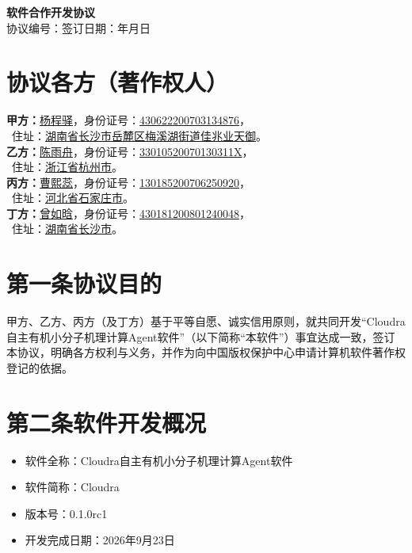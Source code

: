\documentclass[zihao=-4,a4paper,fontset=none]{ctexart}
\begin{document}
\begin{center}
  {\LARGE\bfseries 软件合作开发协议}\\[8pt]
  {\normalsize 协议编号：\underline{\hspace{8em}}\qquad 签订日期：\underline{\hspace{6em}}年\underline{\hspace{3em}}月\underline{\hspace{3em}}日}
\end{center}

\section*{协议各方（著作权人）}

\textbf{甲方：}\underline{杨程驿}，身份证号：\underline{430622200703134876}，\\[2pt]
\qquad\ 住址：\underline{湖南省长沙市岳麓区梅溪湖街道佳兆业天御}。\\[4pt]
\textbf{乙方：}\underline{陈雨舟}，身份证号：\underline{33010520070130311X}，\\[2pt]
\qquad\ 住址：\underline{浙江省杭州市}。\\[4pt]
\textbf{丙方：}\underline{曹熙蕊}，身份证号：\underline{130185200706250920}，\\[2pt]
\qquad\ 住址：\underline{河北省石家庄市}。\\[4pt]
\textbf{丁方：}\underline{曾如晗}，身份证号：\underline{430181200801240048}，\\[2pt]
\qquad\ 住址：\underline{湖南省长沙市}。

\section*{第一条\quad 协议目的}
甲方、乙方、丙方（及丁方）基于平等自愿、诚实信用原则，就共同开发“Cloudra自主有机小分子机理计算Agent软件”（以下简称“本软件”）事宜达成一致，签订本协议，明确各方权利与义务，并作为向中国版权保护中心申请计算机软件著作权登记的依据。

\section*{第二条\quad 软件开发概况}
\begin{itemize}[itemsep=4pt]
  \item 软件全称：Cloudra自主有机小分子机理计算Agent软件
  \item 软件简称：Cloudra
  \item 版本号：0.1.0rc1
  \item 开发完成日期：2026年9月23日
\end{itemize}
\end{document}
